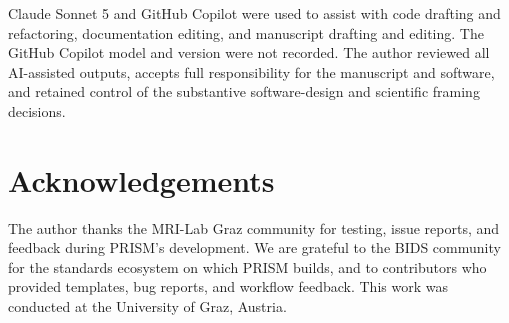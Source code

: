 \documentclass[
]{article}
\begin{document}
Claude Sonnet 5 and GitHub Copilot were used to assist with code
drafting and refactoring, documentation editing, and manuscript drafting
and editing. The GitHub Copilot model and version were not recorded. The
author reviewed all AI-assisted outputs, accepts full responsibility for
the manuscript and software, and retained control of the substantive
software-design and scientific framing decisions.

\section{Acknowledgements}\label{acknowledgements}

The author thanks the MRI-Lab Graz community for testing, issue reports,
and feedback during PRISM's development. We are grateful to the BIDS
community for the standards ecosystem on which PRISM builds, and to
contributors who provided templates, bug reports, and workflow feedback.
This work was conducted at the University of Graz, Austria.

\renewcommand\refname{References}

\end{document}
